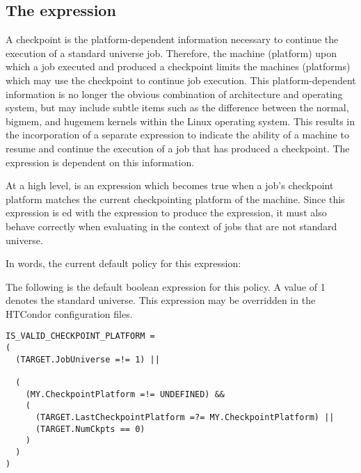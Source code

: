 \subsection{\label{sec:Is-Valid-Checkpoint-Platform}The  expression}

A checkpoint is the platform-dependent information necessary
to continue the execution of a standard universe job.
Therefore, the machine (platform) upon which a job executed
and produced a checkpoint limits the machines (platforms)
which may use the checkpoint to continue job execution.
This platform-dependent information is no longer
the obvious combination of architecture and operating system, 
but may include subtle items such as the 
difference between the normal, bigmem, and hugemem kernels
within the Linux operating system.
This results in the incorporation of a separate
expression to indicate the ability of a machine to
resume and continue the execution of a job that has produced
a checkpoint.
The  expression is dependent on this information.

At a high level,  is an expression
which becomes true when a job's checkpoint platform matches the
current checkpointing platform of the machine. 
Since this expression is ed with the  expression
to produce the  expression,
it must also behave correctly when evaluating in the context of jobs
that are not standard universe.

In words,
the current default policy for this expression:


The following  is the default boolean expression for this
policy.
A  value of 1 denotes the standard universe.
This expression  may be
overridden in the HTCondor configuration files.

\footnotesize
\begin{verbatim}
IS_VALID_CHECKPOINT_PLATFORM = 
(
  (TARGET.JobUniverse =!= 1) ||

  (
    (MY.CheckpointPlatform =!= UNDEFINED) &&
    (
      (TARGET.LastCheckpointPlatform =?= MY.CheckpointPlatform) ||
      (TARGET.NumCkpts == 0)
    )
  )
)
\end{verbatim}
\normalsize

